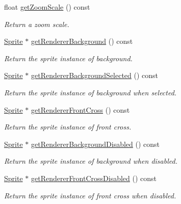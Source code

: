 \begin{DoxyCompactItemize}
float \hyperlink{classui_1_1AbstractCheckButton_aa63466704ea2e8d375796d0a1ca4f1b8}{get\+Zoom\+Scale} () const
\begin{DoxyCompactList}\small\item\em Return a zoom scale. \end{DoxyCompactList}\item 
\hyperlink{classSprite}{Sprite} $\ast$ \hyperlink{classui_1_1AbstractCheckButton_addc339c5331dc8427b525d1ccb675f00}{get\+Renderer\+Background} () const
\begin{DoxyCompactList}\small\item\em Return the sprite instance of background. \end{DoxyCompactList}\item 
\hyperlink{classSprite}{Sprite} $\ast$ \hyperlink{classui_1_1AbstractCheckButton_a1ba602c981e86948cc82b020f8e94958}{get\+Renderer\+Background\+Selected} () const
\begin{DoxyCompactList}\small\item\em Return the sprite instance of background when selected. \end{DoxyCompactList}\item 
\hyperlink{classSprite}{Sprite} $\ast$ \hyperlink{classui_1_1AbstractCheckButton_a6527e80f91a37299249d5b95e6d32a17}{get\+Renderer\+Front\+Cross} () const
\begin{DoxyCompactList}\small\item\em Return the sprite instance of front cross. \end{DoxyCompactList}\item 
\hyperlink{classSprite}{Sprite} $\ast$ \hyperlink{classui_1_1AbstractCheckButton_a0dedc2cffba903975cfff7a6c21d90e8}{get\+Renderer\+Background\+Disabled} () const
\begin{DoxyCompactList}\small\item\em Return the sprite instance of background when disabled. \end{DoxyCompactList}\item 
\hyperlink{classSprite}{Sprite} $\ast$ \hyperlink{classui_1_1AbstractCheckButton_a6b8e3b669fd52665e7ec93157dd1de06}{get\+Renderer\+Front\+Cross\+Disabled} () const
\begin{DoxyCompactList}\small\item\em Return the sprite instance of front cross when disabled. \end{DoxyCompactList}\item 
\mbox{\label{classui_1_1AbstractCheckButton_aba382b9b74ffb88bdbd4f8c00f7a5d1c}} 

\end{DoxyCompactItemize}
